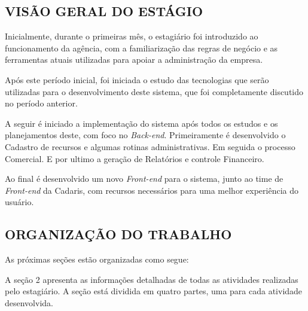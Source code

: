 \documentclass[
  12pt,				%
  openany,
  oneside,
  a4paper,			%
  english,			%
  brazil
]{article}
\numberwithin{figure}{section}
\numberwithin{table}{section}
\begin{document}
\subsection{VISÃO GERAL DO ESTÁGIO}


Inicialmente, durante o primeiras mês, o estagiário foi introduzido ao funcionamento da agência, com a familiarização das regras de negócio e as ferramentas atuais utilizadas para apoiar a administração da empresa.

Após este período inicial, foi iniciada o estudo das tecnologias que serão utilizadas para o desenvolvimento deste sistema, que foi completamente discutido no período anterior.

A seguir é iniciado a implementação do sistema após todos os estudos e os planejamentos deste, com foco no \textit{Back-end}. Primeiramente é desenvolvido o Cadastro de recursos e algumas rotinas administrativas. Em seguida o processo Comercial. E por ultimo a geração de Relatórios e controle Financeiro.

Ao final é desenvolvido um novo \textit{Front-end} para o sistema, junto ao time de \textit{Front-end} da Cadaris, com recursos necessários para uma melhor experiência do usuário.




\subsection{ORGANIZAÇÃO DO TRABALHO}

As próximas seções estão organizadas como segue:

A seção 2 apresenta as informações detalhadas de todas as atividades realizadas pelo estagiário. A seção está dividida em quatro partes, uma para cada atividade desenvolvida.
\end{document}
